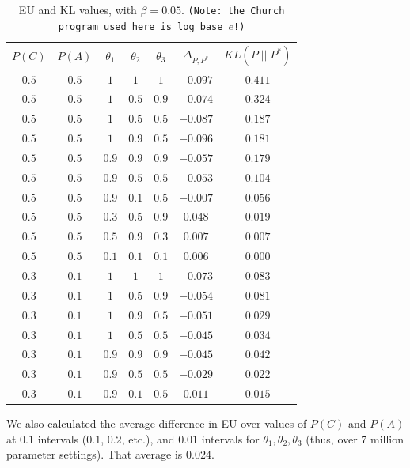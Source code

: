 \documentclass[10pt,letterpaper]{article}
\begin{document}
\begin{table}[h]  \begin{center}
\begin{tabular}{c | c | c | c | c | c | c}
 $P(C)$ & $P(A)$ & $\theta_1$ & $\theta_2$ & $\theta_3$ & $\Delta_{P,P^*}$ & $KL(P \;\vert\vert\; P^*)$ \\ \hline
 $0.5$ & $0.5$ & $1$ & $1$ & $1$ & $-0.097$ & $0.411$ \\
  $0.5$ & $0.5$ & $1$ & $0.5$ & $0.9$ & $-0.074$ & $0.324$ \\
  $0.5$ & $0.5$ &$1$ & $0.5$ & $0.5$ & $-0.087$ & $0.187$ \\
 $0.5$ & $0.5$ & $1$ & $0.9$ & $0.5$ & $-0.096$ & $0.181$ \\
 $0.5$ & $0.5$ & $0.9$ & $0.9$ & $0.9$ & $-0.057$ & $0.179$ \\
 $0.5$ & $0.5$ & $0.9$ & $0.5$ & $0.5$ & $-0.053$ & $0.104$ \\
 $0.5$ & $0.5$ &  $0.9$ & $0.1$ & $0.5$ & $-0.007$ & $0.056$ \\
 $0.5$ & $0.5$ & $0.3$ & $0.5$ & $0.9$ & $0.048$ & $0.019$ \\
 $0.5$ & $0.5$ & $0.5$ & $0.9$ & $0.3$ & $0.007$ & $0.007$ \\
 $0.5$ & $0.5$ & $0.1$ & $0.1$ & $0.1$ & $0.006$ & $0.000$ \\
 $0.3$ & $0.1$ & $1$ & $1$ & $1$ & $-0.073$ & $0.083$ \\
 $0.3$ & $0.1$ & $1$ & $0.5$ & $0.9$ & $-0.054$ & $0.081$ \\
 $0.3$ & $0.1$ & $1$ & $0.9$ & $0.5$ & $-0.051$ & $0.029$ \\
 $0.3$ & $0.1$ &$1$ & $0.5$ & $0.5$ & $-0.045$ & $0.034$ \\
 $0.3$ & $0.1$ & $0.9$ & $0.9$ & $0.9$ & $-0.045$ & $0.042$ \\
 $0.3$ & $0.1$ &  $0.9$ & $0.5$ & $0.5$ & $-0.029$ & $0.022$ \\
 $0.3$ & $0.1$ & $0.9$ & $0.1$ & $0.5$ & $0.011$ & $0.015$
\end{tabular} \end{center} \caption{EU and KL values, with $\beta = 0.05$. \texttt{(Note: the Church program used here is log base $e$!)}} \label{table1}
\end{table} \noindent We also calculated the average difference in EU over values of $P(C)$ and $P(A)$ at $0.1$ intervals ($0.1$, $0.2$, etc.), and $0.01$ intervals for $\theta_1,\theta_2,\theta_3$ (thus, over 7 million parameter settings). That average is $0.024$.
\end{document}
